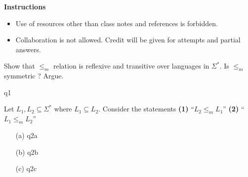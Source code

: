 \documentclass[11pt, a4paper,answers]{exam}
\begin{document}
	\textbf{Instructions}
	\begin{itemize}   \setlength\itemsep{0.1mm}
		\item {\sf  Use of resources other than class notes and references is forbidden.}
		\item {\sf Collaboration is not allowed. Credit will be given for attempts and partial answers.}
	\end{itemize}

\begin{questions}
	
 Show that $\le_m$ relation is  reflexive and transitive  over languages in $\Sigma^*$. Is $\le_m$ symmetric ? Argue.

\begin{solution}
	{q1}
\end{solution}

 Let $L_1, L_2 \subseteq \Sigma^*$ where $L_1 \subseteq L_2$. Consider the statements \textbf{(1)} ``$L_2 \le_m L_1$'' \textbf{(2)} ``$L_1 \le_m L_2$'' 
\begin{solution}
	\begin{enumerate}
		\item[(a)] {q2a}
		\item[(b)] {q2b}
		\item[(c)] {q2c}
	\end{enumerate}
\end{solution}


\end{questions}
\end{document}
